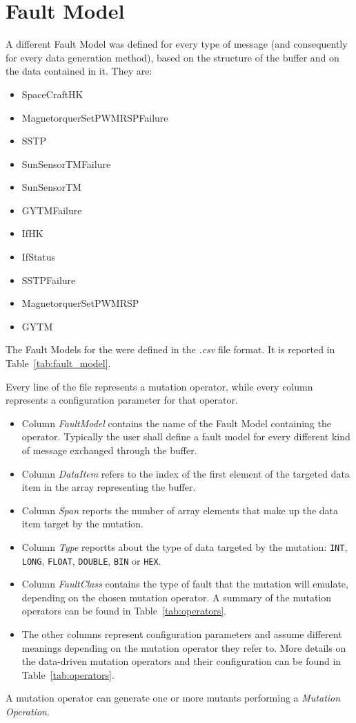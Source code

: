 \section{Fault Model}
A different Fault Model was defined for every type of message (and consequently for every data generation method), based on the structure of the buffer and on the data contained in it.
They are:
\begin{itemize}
\item SpaceCraftHK
\item MagnetorquerSetPWMRSPFailure
\item SSTP
\item SunSensorTMFailure
\item SunSensorTM
\item GYTMFailure
\item IfHK
\item IfStatus
\item SSTPFailure
\item MagnetorquerSetPWMRSP
\item GYTM
\end{itemize}

The Fault Models for the \case were defined in the \emph{.csv} file format. It is reported in Table~\ref{tab:fault_model}.




Every line of the file represents a mutation operator, while every column represents a configuration parameter for that operator.

\begin{itemize}
  \item Column \emph{FaultModel} contains the name of the Fault Model containing the operator. Typically the user shall define a fault model for every different kind of message exchanged through the buffer.

  \item Column \emph{DataItem} refers to the index of the first element of the targeted data item in the array representing the buffer.

  \item Column \emph{Span} reports the number of array elements that make up the data item target by the mutation.

  \item Column \emph{Type} reportts about the type of data targeted by the mutation: \texttt{INT}, \texttt{LONG}, \texttt{FLOAT}, \texttt{DOUBLE}, \texttt{BIN} or \texttt{HEX}.

  \item Column \emph{FaultClass} contains the type of fault that the mutation will emulate, depending on the chosen mutation operator. A summary of the mutation operators can be found in Table~\ref{tab:operators}.

  \item The other columns represent configuration parameters and assume different meanings depending on the mutation operator they refer to. More details on the data-driven mutation operators and their configuration can be found in Table~\ref{tab:operators}.

\end{itemize}



A mutation operator can generate one or more mutants performing a \emph{Mutation Operation}.
